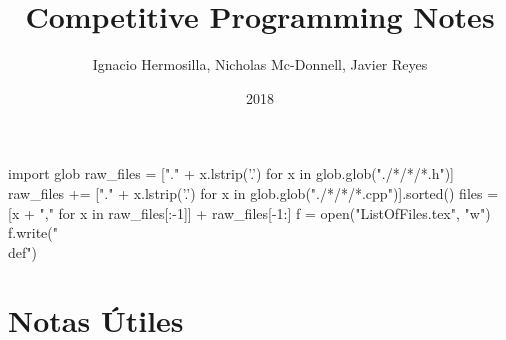 \documentclass[letterpaper]{article}
\title{Competitive Programming Notes}
\author{Ignacio Hermosilla, Nicholas Mc-Donnell, Javier Reyes}
\date{2018}
\begin{document}
\maketitle

\begin{python}
	import glob
	raw_files = ["." + x.lstrip('.') for x in glob.glob("./*/*/*.h")]
	raw_files += ["." + x.lstrip('.') for x in glob.glob("./*/*/*.cpp")].sorted()
	files = [x + "," for x in raw_files[:-1]] + raw_files[-1:]
	f = open("ListOfFiles.tex", "w")
	f.write("\\def{}")
\end{python}



\tableofcontents
\newpage
\section{Notas Útiles}
\end{document}
